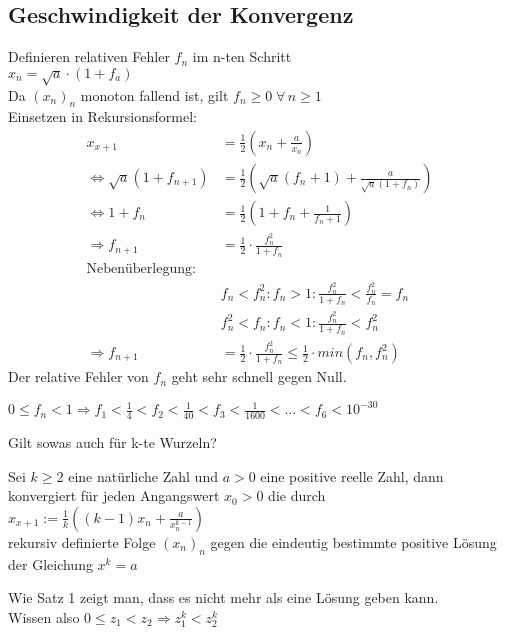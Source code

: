 \documentclass[../ana1u.tex]{subfiles}
\begin{document}
\begin{bsp}
    \subsection{Geschwindigkeit der Konvergenz}
    Definieren relativen Fehler \(f_n\) im n-ten Schritt\\
    \(x_n = \sqrt{a} \cdot (1+f_a)\)\\
    Da \((x_n)_n\) monoton fallend ist, gilt \(f_n \geq 0 \; \forall \, n \geq 1\)\\
    Einsetzen in Rekursionsformel:
    \begin{align*}
        x_{x+1} &= \frac{1}{2}\left(x_n + \frac{a}{x_n}\right)\\
        \Leftrightarrow \sqrt{a}(1+f_{n+1}) &= \frac{1}{2}\left(\sqrt{a}(f_n+1) + \frac{a}{\sqrt{a}(1+f_n)} \right)\\
        \Leftrightarrow 1 + f_n &= \frac{1}{2}\left(1+f_n+\frac{1}{f_n + 1}\right)\\
        \Rightarrow f_{n+1} &= \frac{1}{2} \cdot \frac{f_n^2}{1 + f_n}\\
        \text{Nebenüberlegung:}\\
        &f_n < f_n^2: f_n > 1: \frac{f_n^2}{1+f_n} < \frac{f_n^2}{f_n} = f_n\\
        &f_n^2 < f_n: f_n < 1: \frac{f_n^2}{1+f_n} < f_n^2 \\
        \Rightarrow f_{n+1} &= \frac{1}{2} \cdot \frac{f_n^2}{1+f_n} \leq \frac{1}{2} \cdot min(f_n, f_n^2)
    \end{align*}
    Der relative Fehler von \(f_n\) geht sehr schnell gegen Null.
    \begin{bsp}
        \(0\leq f_n < 1 \Rightarrow f_1 < \frac{1}{4} < f_2 < \frac{1}{40} < f_3 < \frac{1}{1600} < \ldots < f_6 < 10^{-30}\)
    \end{bsp}
    Gilt sowas auch für k-te Wurzeln?
    \begin{satz}
        Sei \(k \geq 2 \) eine natürliche Zahl und \(a > 0\) eine positive reelle Zahl, dann konvergiert für jeden Angangswert \(x_0 > 0\) die durch\\
        \(x_{x+1} := \frac{1}{k} \left((k-1)x_n + \frac{a}{x_n^{k-1}}\right)\)\\
        rekursiv definierte Folge \((x_n)_n\) gegen die eindeutig bestimmte positive Lösung der Gleichung \(x^k = a\)
    \end{satz}
    \begin{bew}
        Wie Satz 1 zeigt man, dass es nicht mehr als eine Lösung geben kann.\\Wissen also \(0 \leq z_1 < z_2 \Rightarrow z_1^k < z_2^k\)\\

\end{bew}
\end{bsp}
\end{document}
